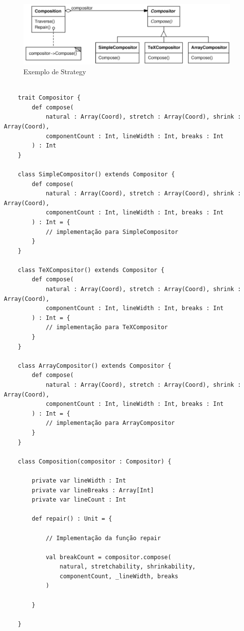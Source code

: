 \begin{figure}[htb]
	\caption{\label{strategy_exemplo}Exemplo de Strategy}
	\begin{center}
	    \includegraphics[scale=0.45]{5_padroes-contexto-funcional/5.3_comportamentais/5.3.09_strategy/exemplo_strategy.png}
	\end{center}
\end{figure}

\begin{lstlisting}[caption={Strategy Orientação a Objetos},label=oostrategy]
    
    trait Compositor {
        def compose(
            natural : Array(Coord), stretch : Array(Coord), shrink : Array(Coord),
            componentCount : Int, lineWidth : Int, breaks : Int
        ) : Int
    }

    class SimpleCompositor() extends Compositor {
        def compose(
            natural : Array(Coord), stretch : Array(Coord), shrink : Array(Coord),
            componentCount : Int, lineWidth : Int, breaks : Int
        ) : Int = {
            // implementação para SimpleCompositor
        }
    }

    class TeXCompositor() extends Compositor {
        def compose(
            natural : Array(Coord), stretch : Array(Coord), shrink : Array(Coord),
            componentCount : Int, lineWidth : Int, breaks : Int
        ) : Int = {
            // implementação para TeXCompositor
        }
    }

    class ArrayCompositor() extends Compositor {
        def compose(
            natural : Array(Coord), stretch : Array(Coord), shrink : Array(Coord),
            componentCount : Int, lineWidth : Int, breaks : Int
        ) : Int = {
            // implementação para ArrayCompositor
        }
    }

    class Composition(compositor : Compositor) {
        
        private var lineWidth : Int
        private var lineBreaks : Array[Int]
        private var lineCount : Int

        def repair() : Unit = {

            // Implementação da função repair

            val breakCount = compositor.compose(
                natural, stretchability, shrinkability,
                componentCount, _lineWidth, breaks
            )
    
        }

    }

\end{lstlisting}

